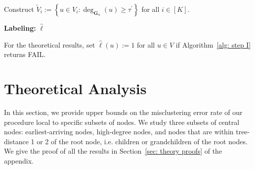 \documentclass[twoside,11pt]{article}
\theoremstyle{remark}
\begin{document}



\begin{algorithm}[tbp]

\caption{Distance Recovery}
\label{alg: distance recovery}


Construct $\tilde{V}_i:= \left\{u\in V_i: \deg_{\boldsymbol{G}_n}\left(u\right)\ge \tau^\prime\right\}$ for all $i \in [K]$.

\textbf{Labeling:}\:
\Return $\hat{\ell}$\;
    

\end{algorithm}

For the theoretical results, set $\hat\ell(u):=1$ for all $u\in V$ if Algorithm~\ref{alg: step I} returns FAIL.

\section{Theoretical Analysis}
\label{sec: theory}

In this section, we provide upper bounds on the misclustering error rate of our procedure local to specific subsets of nodes. We study three subsets of central nodes: earliest-arriving nodes, high-degree nodes, and nodes that are within tree-distance 1 or 2 of the root node, i.e. children or grandchildren of the root nodes. We give the proof of all the results in Section~\ref{sec: theory proofs} of the appendix. 
\end{document}
